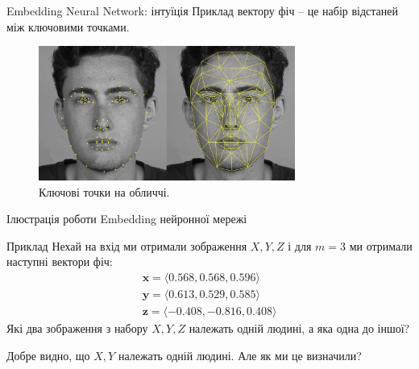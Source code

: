 \documentclass[xcolor={usenames,dvipsnames}]{beamer}
\begin{document}
    \begin{frame}{Embedding Neural Network: інтуїція}
        Приклад вектору фіч -- це набір відстаней між ключовими точками.
        \begin{figure}
        \centering
            \includegraphics[width=0.75\textwidth]{images/keypoints.jpg}
            \caption{Ключові точки на обличчі.}
        \end{figure}
    \end{frame}

    \begin{frame}{Ілюстрація роботи Embedding нейронної мережі}
        \begin{exampleblock}{Приклад}
            Нехай на вхід ми отримали зображення $X,Y,Z$ і для $m=3$ ми отримали наступні вектори фіч:
            \begin{gather*}
                \mathbf{x} = \langle 0.568, 0.568, 0.596\rangle \\
                \mathbf{y} = \langle 0.613, 0.529, 0.585\rangle \\
                \mathbf{z} = \langle -0.408, -0.816, 0.408\rangle
            \end{gather*}
            Які два зображення з набору $X,Y,Z$ належать одній людині, а яка одна до іншої?
        \end{exampleblock}
        Добре видно, що $X,Y$ належать одній людині. Але як ми це визначили? 
    \end{frame}
\end{document}
